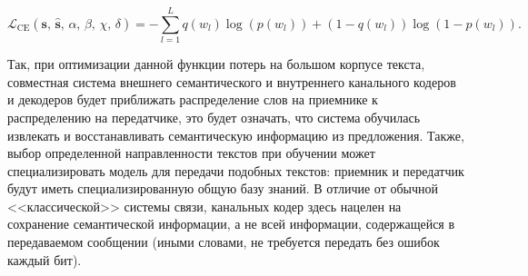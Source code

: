 \documentclass[a4paper,12pt]{article}
\begin{document}
	\begin{equation}
		\mathcal{L}_\text{CE}({\mathbf{s}},\,\hat{\mathbf{s}},\,\alpha,\,\beta,\,\chi,\,\delta) = 
		- \sum\limits_{l=1}^{L} q(w_l) \log(p(w_l)) + (1-q(w_l)) \log(1-p(w_l)).
	\end{equation}
	
	Так, при оптимизации данной функции потерь на большом корпусе текста, совместная система внешнего семантического и внутреннего канального кодеров и декодеров будет приближать распределение слов на приемнике к распределению на передатчике, это будет означать, что система обучилась извлекать и восстанавливать семантическую информацию из предложения. Также, выбор определенной направленности текстов при обучении может специализировать модель для передачи подобных текстов: приемник и передатчик будут иметь специализированную общую базу знаний. В отличие от обычной <<классической>> системы связи, канальных кодер здесь нацелен на сохранение семантической информации, а не всей информации, содержащейся в передаваемом сообщении (иными словами, не требуется передать без ошибок каждый бит).
	
\end{document}
